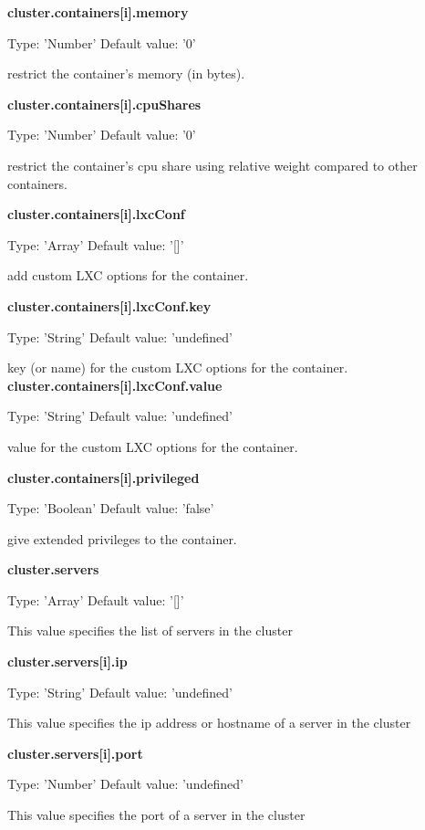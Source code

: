 \documentclass[a4paper,11pt,twoside]{report}
\begin{document}
\begin{appendices}
\noindent
\textbf{cluster.containers[i].memory}

\noindent
Type: 'Number' Default value: '0'\smallskip

\noindent 
restrict the container's memory (in bytes).\bigskip

\noindent
\textbf{cluster.containers[i].cpuShares}

\noindent
Type: 'Number' Default value: '0'\smallskip

\noindent 
restrict the container's cpu share using relative weight compared to other containers.\bigskip

\noindent
\textbf{cluster.containers[i].lxcConf}

\noindent
Type: 'Array' Default value: '[]'\smallskip

\noindent 
add custom LXC options for the container.\bigskip

\noindent
\textbf{cluster.containers[i].lxcConf.key}

\noindent
Type: 'String' Default value: 'undefined'\smallskip

\noindent 
key (or name) for the custom LXC options for the container.\bigskip
\noindent
\textbf{cluster.containers[i].lxcConf.value}

\noindent
Type: 'String' Default value: 'undefined'\smallskip

\noindent 
value for the custom LXC options for the container.\bigskip

\noindent
\textbf{cluster.containers[i].privileged}

\noindent
Type: 'Boolean' Default value: 'false'\smallskip

\noindent 
give extended privileges to the container.\bigskip

\noindent
\textbf{cluster.servers}

\noindent
Type: 'Array'  Default value: '[]'\smallskip

\noindent
This value specifies the list of servers in the cluster\bigskip

\noindent
\textbf{cluster.servers[i].ip}

\noindent
Type: 'String' Default value: 'undefined'\smallskip

\noindent 
This value specifies the ip address or hostname of a server in the cluster\bigskip

\noindent
\textbf{cluster.servers[i].port}

\noindent
Type: 'Number' Default value: 'undefined'\smallskip

\noindent
This value specifies the port of a server in the cluster\bigskip


\end{appendices}
\end{document}
